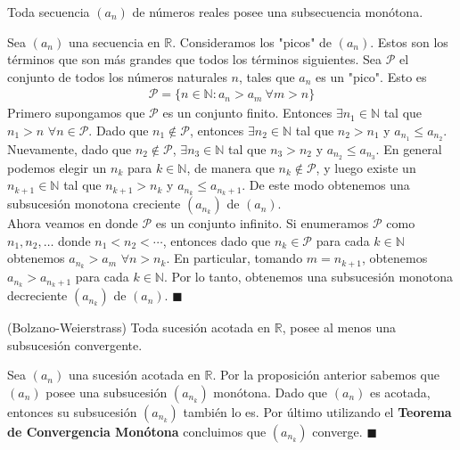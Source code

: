 \documentclass[12pt]{book}
\renewenvironment{proof}[1][\textit{Demostración}]{%
  \par\noindent{\bfseries #1.}\enspace}{\hfill$\blacksquare$\par}
\begin{document}
\begin{teo}{}{}
    Toda secuencia $(a_n)$ de números reales posee una subsecuencia monótona.
\end{teo}
\begin{proof}
    Sea $(a_n)$ una secuencia en $\mathbb{R}$. Consideramos los "picos" de $(a_n)$. Estos son los términos que son más grandes que todos los términos siguientes. Sea $\mathcal{P}$ el conjunto de todos los números naturales $n$, tales que $a_n$ es un "pico". Esto es 
    \begin{align*}
        \mathcal{P}= \{ n \in \mathbb{N} : a_n > a_m \ \forall m >n \}
    \end{align*}
    Primero supongamos que $\mathcal{P}$ es un conjunto finito. Entonces $\exists n_1 \in \mathbb{N}$ tal que $n_1 >n$ $\forall n \in \mathcal{P}$. Dado que $n_1 \notin \mathcal{P}$, entonces $\exists n_2 \in \mathbb{N}$ tal que $n_2 >n_1$ y $a_{n_1} \leq a_{n_2}$. Nuevamente, dado que $n_2 \notin \mathcal{P}$, $\exists n_3 \in \mathbb{N}$ tal que $n_3>n_2$ y $a_{n_2}\leq a_{n_3}$. En general podemos elegir un $n_k$ para $k \in \mathbb{N}$, de manera que $n_k \notin \mathcal{P}$, y luego existe un $n_{k+1} \in \mathbb{N}$ tal que $n_{k+1} > n_{k}$ y $a_{n_k} \leq a_{n_k+1}$. De este modo obtenemos una subsucesión monotona creciente $(a_{n_k})$ de $(a_n)$.\\

    Ahora veamos en donde $\mathcal{P}$ es un conjunto infinito. Si enumeramos $\mathcal{P}$ como $n_1, n_2, \ldots$ donde $n_1 < n_2 < \cdots $, entonces dado que $n_k \in \mathcal{P}$ para cada $k \in \mathbb{N}$ obtenemos $a_{n_k} > a_m$ $\forall n > n_k$. En particular, tomando $m=n_{k+1}$, obtenemos $a_{n_k} > a_{n_k+1}$ para cada $k \in \mathbb{N}$. Por lo tanto, obtenemos una subsucesión monotona decreciente $(a_{n_k})$ de $(a_n)$.
 \end{proof}

 \begin{teo}{(Bolzano-Weierstrass)}{}
     Toda sucesión acotada en $\mathbb{R}$, posee al menos una subsucesión convergente. 
 \end{teo}
 \begin{proof}
     Sea $(a_n)$ una sucesión acotada en $\mathbb{R}$. Por la proposición anterior sabemos que $(a_n)$ posee una subsucesión $(a_{n_k})$ monótona. Dado que $(a_n)$ es acotada, entonces su subsucesión $(a_{n_k})$ también lo es. Por último utilizando el \textbf{Teorema de Convergencia Monótona} concluimos que $(a_{n_k})$ converge.
 \end{proof}
\end{document}
